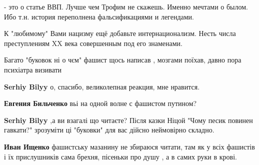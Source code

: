 \begin{itemize}
- это о статье ВВП. Лучше чем Трофим не скажешь. Именно мечтами о былом. Ибо
т.н. история переполнена фальсификациями и легендами.

К "любимому" Вами нацизму ещё добавьте интернационализм. Несть числа
преступлениям XX века совершенным под его знаменами.



 

Багато "буковок ні о чєм" фашист щось написав , мозгами поїхав, давно пора
психіатра визивати

\begin{itemize}
 
\textbf{Serhiy Bilyy} о, спасибо, великолепная реакция, мне нравится.

 
\textbf{Евгения Бильченко} вьі на одной волне с фашистом путином?

 
\textbf{Serhiy Bilyy} ,а ви взагалі що читаєте? Після казки Ніцой "Чому песик повинен гавкати?" зрозуміти ці "буковки" для вас дійсно неймовірно складно.

 
\textbf{Иван Ищенко} фашистську мазанину не збираюся читати, там як у всіх
фашистів і їх прислушників сама брехня, пісеньки про душу , а в самих руки в
крові.


\end{itemize}
\end{itemize}
